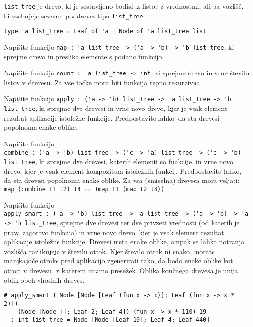\documentclass[arhiv]{../izpit}
\begin{document}
\verb|list_tree| je drevo, ki je sestavljeno bodisi iz listov z vrednostmi, 
ali pa vozlišč, ki vsebujejo seznam poddreves tipa \verb|list_tree|.

\begin{verbatim}
type 'a list_tree = Leaf of 'a | Node of 'a list_tree list
\end{verbatim}

\podnaloga
Napišite funkcijo \verb|map : 'a list_tree -> ('a -> 'b) -> 'b list_tree|, ki sprejme drevo in preslika elemente s podano funkcijo. 

\podnaloga
Napišite funkcijo \verb|count : 'a list_tree -> int|, ki sprejme drevo in vrne število listov v drevesu. Za vse točke mora biti funkcija repno rekurzivna.

\podnaloga
Napišite funkcijo \verb|apply : ('a -> 'b) list_tree -> 'a list_tree -> 'b list_tree|, ki sprejme dve drevesi in vrne novo drevo, kjer je vsak element rezultat aplikacije istoležne funkcije. Predpostavite lahko, da sta drevesi popolnoma enake oblike.

\podnaloga
Napišite funkcijo \\\verb|combine : ('a -> 'b) list_tree -> ('c -> 'a) list_tree -> ('c -> 'b) list_tree|, ki sprejme dve drevesi, katerih elementi so funkcije, in vrne novo drevo, kjer je vsak element kompozitum istoležnih funkcij. Predpostavite lahko, da sta drevesi popolnoma enake oblike. Za vsa (smiselna) drevesa mora veljati: \verb|map (combine t1 t2) t3 == (map t1 (map t2 t3))|

\podnaloga
Napišite funkcijo \\\verb|apply_smart : ('a -> 'b) list_tree -> 'a list_tree -> ('a -> 'b) -> 'a -> 'b list_tree|, sprejme dve drevesi ter dve privzeti vrednosti (od katerih je prava zagotovo funkcija) in vrne novo drevo, kjer je vsak element rezultat aplikacije istoležne funkcije. Drevesi nista enake oblike, ampak se lahko notranja vozlišča razlikujejo v številu otrok. Kjer število otrok ni enako, morate manjkajoče otroke pred aplikacijo zgenerirati tako, da bodo enake oblike kot otroci v drevesu, v katerem imamo presežek. Oblika končnega drevesa je unija oblik obeh vhodnih dreves.

\begin{verbatim}
# apply_smart ( Node [Node [Leaf (fun x -> x)]; Leaf (fun x -> x * 2)]) 
    (Node [Node []; Leaf 2; Leaf 4]) (fun x -> x * 110) 19
- : int list_tree = Node [Node [Leaf 19]; Leaf 4; Leaf 440]
\end{verbatim}
\end{document}
